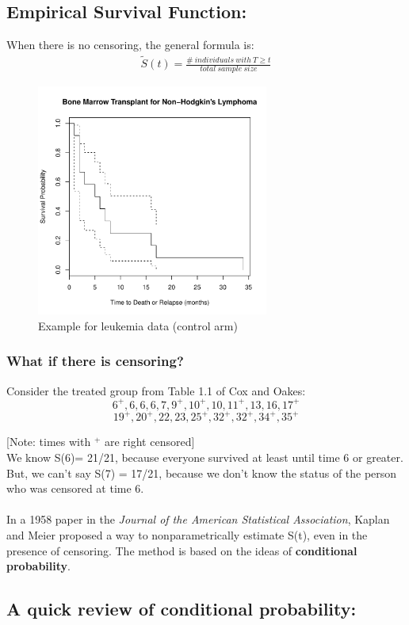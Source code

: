 \documentclass[11pt,slidesonly,semrot,portrait,palatino]{book}
\begin{document}
\subsection{Empirical Survival Function:}
When there is no censoring, the general formula is:
\begin{eqnarray*}
\tilde{S}(t) = \frac{\#~individuals~ with~T \ge t}
       {total~sample~size}
\end{eqnarray*}
\begin{figure}[h]
\centerline{\includegraphics[width=3in]{surv_control.pdf}}
\caption{Example for leukemia data (control arm)}
\end{figure}
\subsubsection{What if there is censoring?}

Consider the treated group from Table 1.1 of Cox and Oakes:\\
\[6^+,6,6,6,7,9^+,10^+,10,11^+,13,16,17^+\]
\[19^+,20^+,22,23,25^+,32^+,32^+,34^+,35^+\]


[Note: times with $^+$ are right censored]
\\
We know S(6)= 21/21, because everyone survived at least until time
6 or greater.  But, we can't say S(7) = 17/21, because we don't know
the status of the person who was censored at time 6.  \\[2ex]
\\
In a 1958 paper in the {\em Journal of the American Statistical
Association}, Kaplan and Meier
 proposed a way to nonparametrically estimate S(t),
even in the presence of censoring.  The method
is based on the ideas of {\bf conditional probability}.
\subsection{A quick review of conditional probability:}
\end{document}
